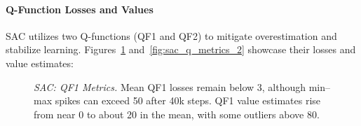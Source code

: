 \paragraph{Q-Function Losses and Values}
SAC utilizes two Q-functions (QF1 and QF2) to mitigate overestimation and stabilize learning. Figures~\ref{fig:sac_q_metrics_1} and~\ref{fig:sac_q_metrics_2} showcase their losses and value estimates:
\begin{figure}
	\centering
	\caption{\emph{SAC: QF1 Metrics.} Mean QF1 losses remain below 3, although min–max spikes can exceed 50 after 40k steps. QF1 value estimates rise from near 0 to about 20 in the mean, with some outliers above 80.}
	\label{fig:sac_q_metrics_1}
\end{figure}

